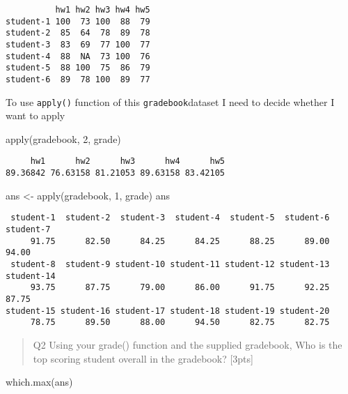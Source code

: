 \documentclass[
  letterpaper,
  DIV=11,
  numbers=noendperiod]{scrartcl}
\newenvironment{Shaded}{\begin{snugshade}}{\end{snugshade}}
\newcommand{\DecValTok}[1]{\textcolor[rgb]{0.68,0.00,0.00}{#1}}
\newcommand{\FunctionTok}[1]{\textcolor[rgb]{0.28,0.35,0.67}{#1}}
\newcommand{\NormalTok}[1]{\textcolor[rgb]{0.00,0.23,0.31}{#1}}
\newcommand{\OtherTok}[1]{\textcolor[rgb]{0.00,0.23,0.31}{#1}}
\begin{document}
\begin{verbatim}
          hw1 hw2 hw3 hw4 hw5
student-1 100  73 100  88  79
student-2  85  64  78  89  78
student-3  83  69  77 100  77
student-4  88  NA  73 100  76
student-5  88 100  75  86  79
student-6  89  78 100  89  77
\end{verbatim}

To use \texttt{apply()} function of this \texttt{gradebook}dataset I
need to decide whether I want to apply

\begin{Shaded}
\begin{Highlighting}[]
\FunctionTok{apply}\NormalTok{(gradebook, }\DecValTok{2}\NormalTok{, grade)}
\end{Highlighting}
\end{Shaded}

\begin{verbatim}
     hw1      hw2      hw3      hw4      hw5 
89.36842 76.63158 81.21053 89.63158 83.42105 
\end{verbatim}

\begin{Shaded}
\begin{Highlighting}[]
\NormalTok{ans }\OtherTok{\textless{}{-}} \FunctionTok{apply}\NormalTok{(gradebook, }\DecValTok{1}\NormalTok{, grade)}
\NormalTok{ans}
\end{Highlighting}
\end{Shaded}

\begin{verbatim}
 student-1  student-2  student-3  student-4  student-5  student-6  student-7 
     91.75      82.50      84.25      84.25      88.25      89.00      94.00 
 student-8  student-9 student-10 student-11 student-12 student-13 student-14 
     93.75      87.75      79.00      86.00      91.75      92.25      87.75 
student-15 student-16 student-17 student-18 student-19 student-20 
     78.75      89.50      88.00      94.50      82.75      82.75 
\end{verbatim}

\begin{quote}
Q2 Using your grade() function and the supplied gradebook, Who is the
top scoring student overall in the gradebook? {[}3pts{]}
\end{quote}

\begin{Shaded}
\begin{Highlighting}[]
\FunctionTok{which.max}\NormalTok{(ans)}
\end{Highlighting}
\end{Shaded}
\end{document}
